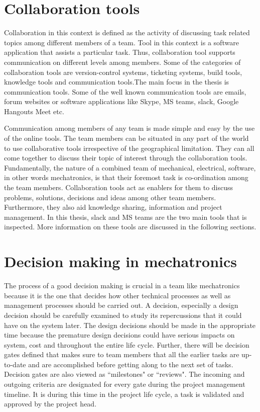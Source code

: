 \section{Collaboration tools}
Collaboration in this context is defined as the activity of discussing task related topics among different members of a team. Tool in this context is a software application that assists a particular task\cite{lomas_collaboration_nodate}. Thus, collaboration tool supports communication on different levels among members.  Some of the categories of collaboration tools are version-control systems, ticketing systems, build tools, knowledge tools and communication tools.The main focus in the thesis is communication tools.  Some of the well known communication tools are emails, forum websites or software applications like Skype, MS teams, slack, Google Hangouts Meet etc. 

Communication among members of any team is made simple and easy by the use of the online tools. The team members can be situated in any part of the world to use collaborative tools irrespective of the geographical limitation. They can all come together to discuss their topic of interest through the collaboration tools. Fundamentally, the nature of a combined team of mechanical, electrical, software, in other words mechatronics, is that their foremost task is co-ordination among the team members. Collaboration tools act as enablers for them to discuss problems, solutions, decisions and ideas among other team members. Furthermore, they also aid knowledge sharing, information and project management\cite{lomas_collaboration_nodate}. In this thesis, slack and MS teams are the two main tools that is inspected. More information on these tools are discussed in the following sections.
 

\section{Decision making in mechatronics} The process of a good decision making is crucial in a team like mechatronics because it is the one that decides how other technical processes as well as management processes should be carried out. A decision, especially a design decision should be carefully examined to study its repercussions that it could have on the system later.  The design decisions should be made in the appropriate time because the premature design decisions could have serious impacts on system, cost and throughout the entire life cycle. Further, there will be decision gates defined that makes sure to team members that all the earlier tasks are up-to-date and are accomplished before getting along to the next set of tasks. Decision gates are also viewed as ``milestones" or ``reviews". The incoming and outgoing criteria are designated for every gate during the project management timeline. It is during this time in the project life cycle, a task is validated and approved by the project head\cite{walden2015}. 

